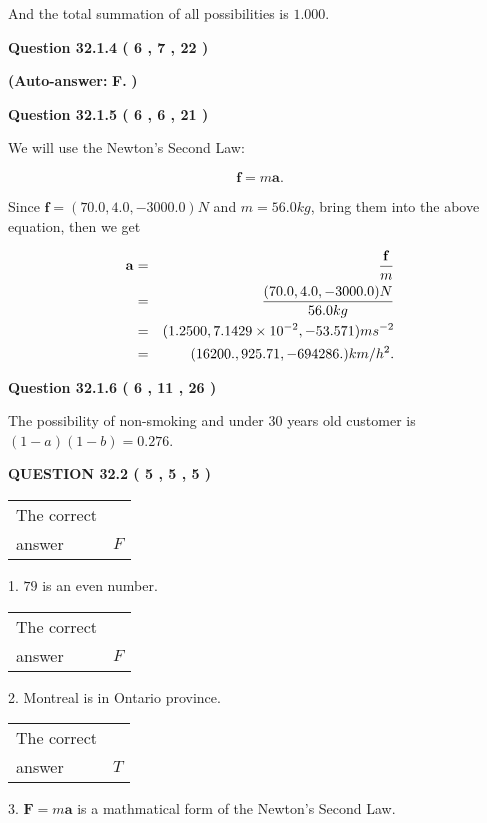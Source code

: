 \documentclass[12pt]{article}
\begin{document}
\noindent
 And the total summation of all possibilities is $  %
1.000 $.
 
  
  
{\textbf{\large{Question
32.1.4 
 (           6 ,           7 ,          22 )
}}}
 
 
{\textbf{(Auto-answer:}}
{\textbf{\large{
F.}}}
{\textbf{)}}
 
 
  
  
{\textbf{\large{Question
32.1.5 
 (           6 ,           6 ,          21 )
}}}

We will use the Newton's Second Law:
 
\[
\mathbf{f}=m\mathbf{a}.
\]
 
Since $\mathbf{f}=( %
70.0,  %
4.0,  %
-3000.0 )N$
and $m= %
56.0 kg$, bring them into the above equation, then we get
 
\begin{eqnarray*}
\mathbf{a}&=&\frac{\mathbf{f}}m  \\
&=&\frac{(
70.0 ,
4.0 ,
-3000.0 )N
}{ %
56.0 kg}  \\
&=&(
1.2500 ,
7.1429 \times 10^{-2},
-53.571
)ms^{-2} \\
&=&(
16200. ,
925.71 ,
-694286.
)km/h^2.
\end{eqnarray*}
 
  
  
{\textbf{\large{Question
32.1.6 
 (           6 ,          11 ,          26 )
}}}

The possibility of  %
 non-smoking and  %
under 30 years old
customer is $ (1-a)(1-b) =  %
0.276 $.
  
  
{\textbf{\large{QUESTION
32.2 
 (           5 ,           5 ,           5 )
}}}

 
\noindent\begin{tabular}{|l|l|}\hline The correct & \\
          answer &  %
$F$ \\ \hline \end{tabular}
1. $ %
79$ is an  %
even number.
 
\noindent\begin{tabular}{|l|l|}\hline The correct & \\
          answer &  %
$F$ \\ \hline \end{tabular}
2.  %
Montreal is in  %
Ontario province.
 
\noindent\begin{tabular}{|l|l|}\hline The correct & \\
          answer &  %
$T$ \\ \hline \end{tabular}
3.  %
$\mathbf{F}=m\mathbf{a}$ is a mathmatical form of  %
the Newton's Second Law.
 
\end{document}
